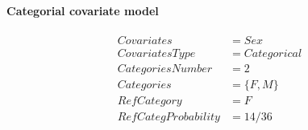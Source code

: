 \paragraph{Categorial covariate model}
\begin{align*}
Covariates &= Sex   \\
CovariatesType &= Categorical  \\
CategoriesNumber &= 2   \\
Categories &= \{F,M\}   \\
RefCategory &= F   \\
RefCategProbability &= 14/36 
\end{align*}



